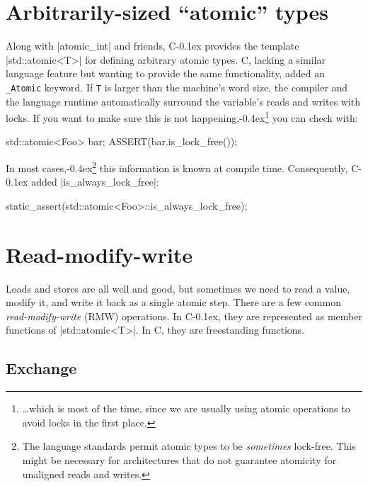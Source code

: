 \documentclass[fontsize=10pt, oneside]{scrartcl}
\newcommand{\punckern}{\kern-0.4ex}
\newcommand{\monobox}[1]{\mbox{\texttt{#1}}}
\newcommand{\keyword}[1]{\monobox{\color{darkGreen}#1}}
\newcommand{\cplusplus}[1]{C\kern-0.1ex\raisebox{0.15ex}{\texttt{++}}}
\newcommand{\clang}[1]{C}
\newcommand{\introduce}[1]{\textit{#1}}
\begin{document}
\section{Arbitrarily-sized ``atomic'' types}

Along with \cc|atomic_int| and friends,
\cplusplus{} provides the template \cpp|std::atomic<T>| for defining arbitrary atomic types.
\clang{}, lacking a similar language feature but wanting to provide the same functionality,
added an \keyword{\_Atomic} keyword.
If \texttt{T} is larger than the machine's word size,
the compiler and the language runtime automatically surround the variable's reads and writes with locks.
If you want to make sure this is not happening,\punckern\footnote{%
\ldots which is most of the time,
since we are usually using atomic operations to avoid locks in the first place.}
you can check with:
\begin{cppcode}
std::atomic<Foo> bar;
ASSERT(bar.is_lock_free());
\end{cppcode}
In most cases,\punckern\footnote{%
The language standards permit atomic types to be \emph{sometimes} lock-free.
This might be necessary for architectures that do not guarantee atomicity for unaligned reads and writes.}
this information is known at compile time.
Consequently, \cplusplus{17} added \cpp|is_always_lock_free|:
\begin{cppcode}
static_assert(std::atomic<Foo>::is_always_lock_free);
\end{cppcode}

\section{Read-modify-write}
\label{rmw}

Loads and stores are all well and good,
but sometimes we need to read a value, modify it,
and write it back as a single atomic step.
There are a few common \introduce{read-modify-write} (\textsc{RMW}) operations.
In \cplusplus{}, they are represented as member functions of \cpp|std::atomic<T>|.
In \clang{}, they are freestanding functions.

\subsection{Exchange}
\label{exchange}
\end{document}
